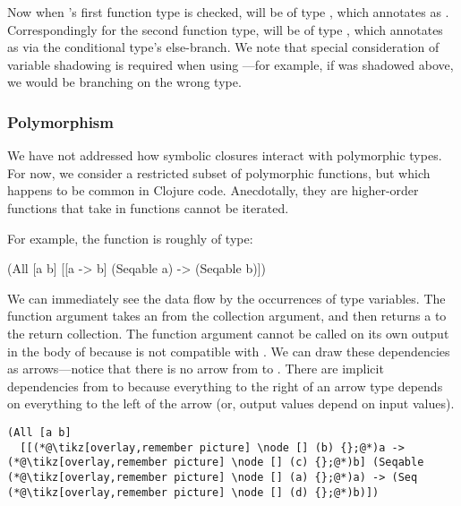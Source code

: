 Now when 's first function type is checked,
 will be of type , which annotates
 as .
Correspondingly for the second function type,
 will be of type , which annotates
 as  via the conditional type's else-branch.
We note that special consideration of variable shadowing is required when using ---for
example, if  was shadowed above, we would be branching on the wrong type.

\subsubsection{Polymorphism}

We have not addressed how symbolic closures interact with polymorphic types.
For now, we consider a restricted subset of polymorphic functions, but which happens to be
common in Clojure code.
Anecdotally, they are higher-order functions that take in functions cannot be iterated.

For example, the  function is roughly of type:

\begin{cljlisting}
(All [a b]
  [[a -> b] (Seqable a) -> (Seqable b)])
\end{cljlisting}

We can immediately see the data flow by the occurrences of type variables.
The function argument takes an  from the collection argument,
and then returns a  to the return collection.
The function argument cannot be called on its own output in the body
of  because  is not compatible with .
We can draw these dependencies as arrows---notice that there is no arrow
from  to . There are implicit dependencies from
 to  because everything to the right of an arrow type depends
on everything to the left of the arrow (or, output values depend
on input values).


\begin{lstlisting}
(All [a b]
  [[(*@\tikz[overlay,remember picture] \node [] (b) {};@*)a -> (*@\tikz[overlay,remember picture] \node [] (c) {};@*)b] (Seqable (*@\tikz[overlay,remember picture] \node [] (a) {};@*)a) -> (Seq (*@\tikz[overlay,remember picture] \node [] (d) {};@*)b)])
\end{lstlisting}

